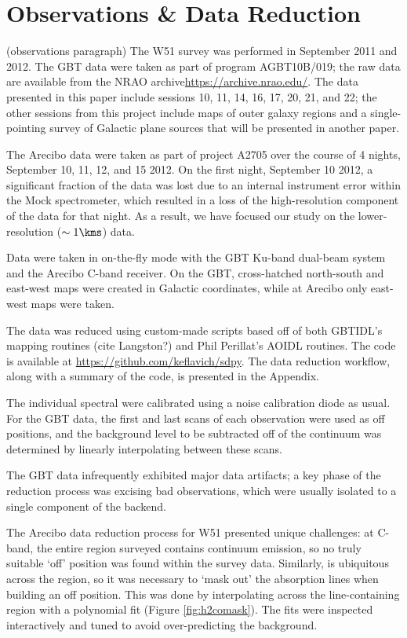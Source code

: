 \section{Observations \& Data Reduction}

(observations paragraph)
The W51 survey was performed in September 2011 and 2012.  The GBT data were
taken as part of program AGBT10B/019; the raw data are available from the NRAO
archive\url{https://archive.nrao.edu/}.  The data presented in this paper
include sessions 10, 11, 14, 16, 17, 20, 21, and 22; the other sessions from
this project include maps of outer galaxy regions and a single-pointing survey
of Galactic plane sources that will be presented in another paper. 

The Arecibo data were taken as part of project A2705 over the course of 4
nights, September 10, 11, 12, and 15 2012.  On the first night, September 10
2012, a significant fraction of the data was lost due to an internal instrument
error within the Mock spectrometer, which resulted in a loss of the
high-resolution component of the \formaldehyde data for that night.  As a
result, we have focused our study on the lower-resolution ($\sim1 \kms$) data.

Data were taken in on-the-fly mode with the GBT Ku-band dual-beam system and
the Arecibo C-band receiver.  On the GBT, cross-hatched north-south and
east-west maps were created in Galactic coordinates, while at Arecibo only
east-west maps were taken.

The data was reduced using custom-made scripts based off of both GBTIDL's
mapping routines (cite Langston?) and Phil Perillat's AOIDL routines.  The code
is available at \url{https://github.com/keflavich/sdpy}.  The data reduction
workflow, along with a summary of the code, is presented in the Appendix.

The individual spectral were calibrated using a noise calibration diode as
usual.  For the GBT data, the first and last scans of each observation were
used as off positions, and the background level to be subtracted off of the
continuum was determined by linearly interpolating between these scans.

The GBT data infrequently exhibited major data artifacts; a key phase of the
reduction process was excising bad observations, which were usually isolated to
a single component of the backend.

The Arecibo data reduction process for W51
presented unique challenges: at C-band, the entire region surveyed contains
continuum emission, so no truly suitable `off' position was found within the
survey data.  Similarly, \formaldehyde is ubiquitous across the region, so it
was necessary to `mask out' the absorption lines when building an off position.
This was done by interpolating across the line-containing region with a
polynomial fit (Figure \ref{fig:h2comask}).  The fits were inspected interactively
and tuned to avoid over-predicting the background.


